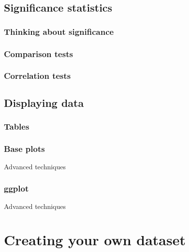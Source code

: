\documentclass[
]{book}
\begin{document}
\hypertarget{significance-statistics}{%
\chapter{Significance statistics}\label{significance-statistics}}

\hypertarget{thinking-about-significance}{%
\section{Thinking about significance}\label{thinking-about-significance}}

\hypertarget{comparison-tests}{%
\section{Comparison tests}\label{comparison-tests}}

\hypertarget{correlation-tests}{%
\section{Correlation tests}\label{correlation-tests}}

\hypertarget{displaying-data}{%
\chapter{Displaying data}\label{displaying-data}}

\hypertarget{tables}{%
\section{Tables}\label{tables}}

\hypertarget{base-plots-1}{%
\section{Base plots}\label{base-plots-1}}

Advanced techniques

\hypertarget{ggplot}{%
\section{ggplot}\label{ggplot}}

Advanced techniques

\hypertarget{part-creating-your-own-dataset}{%
\part{Creating your own dataset}\label{part-creating-your-own-dataset}}
\end{document}
